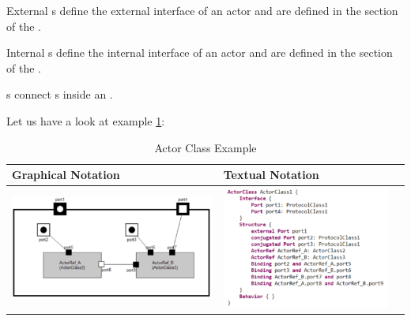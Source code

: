 External s define the external interface of an actor and are defined in the  
section of the .

Internal s define the internal interface of an actor and are defined in the  
section of the .

s connect s inside an .

Let us have a look at example \ref{tab:actor_class_example}:

\begin{table}
\caption{Actor Class Example}
\label{tab:actor_class_example}
\begin{tabular}{|l|l|l|}
\hline
 \textbf{Graphical Notation} & \textbf{Textual Notation} \\ \hline
 \includegraphics[scale=0.7]{images/040-ActorClass.png} & 
\includegraphics[scale=0.7]{images/040-ActorClassExampleTextualNotation.png} \\ \hline
 \end{tabular}
 \end{table}

